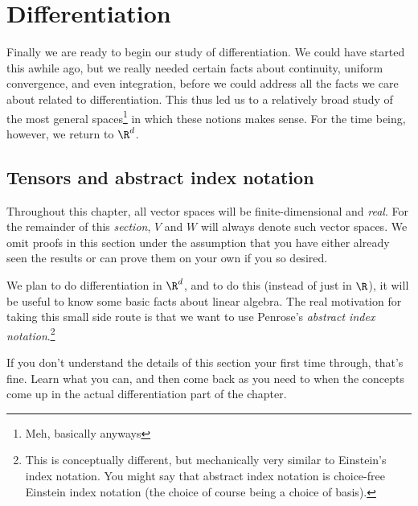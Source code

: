 \chapter{Differentiation}\label{chp5x}

Finally we are ready to begin our study of differentiation.  We could have started this awhile ago, but we really needed certain facts about continuity, uniform convergence, and even integration, before we could address all the facts we care about related to differentiation.  This thus led us to a relatively broad study of the most general spaces\footnote{Meh, basically anyways} in which these notions makes sense.  For the time being, however, we return to $\R ^d$.

\section{Tensors and abstract index notation}

\begin{displayquote}
Throughout this chapter, all vector spaces will be finite-dimensional and \emph{real}.  For the remainder of this \emph{section}, $V$ and $W$ will always denote such vector spaces.  We omit proofs in this section under the assumption that you have either already seen the results or can prove them on your own if you so desired.
\end{displayquote}

We plan to do differentiation in $\R ^d$, and to do this (instead of just in $\R$), it will be useful to know some basic facts about linear algebra.  The real motivation for taking this small side route is that we want to use Penrose's \emph{abstract index notation}.\footnote{This is conceptually different, but mechanically very similar to Einstein's index notation.  You might say that abstract index notation is choice-free Einstein index notation (the choice of course being a choice of basis).}

\begin{displayquote}
If you don't understand the details of this section your first time through, that's fine.  Learn what you can, and then come back as you need to when the concepts come up in the actual differentiation part of the chapter.
\end{displayquote}

